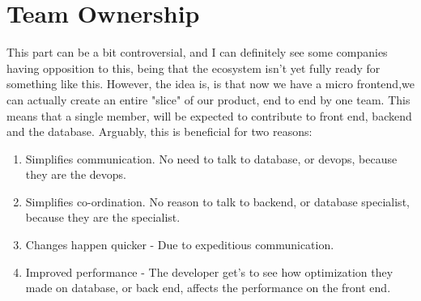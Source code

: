 \section{Team Ownership}
This part can be a bit controversial, and I can definitely see some companies having opposition to this, being that the ecosystem isn't yet fully ready for something like this. However, the idea is, is that now we have a micro frontend,we can actually create an entire "slice" of our product, end to end by one team. This means that a single member, will be expected to contribute to front end, backend and the database. Arguably, this is beneficial for two reasons: 
\begin{enumerate}
  \item Simplifies communication. No need to talk to database, or devops, because they are the devops. 
  \item Simplifies co-ordination. No reason to talk to backend, or database specialist, because they are the specialist. 
  \item Changes happen quicker - Due to expeditious communication.
  \item Improved performance - The developer get's to see how optimization they made on database, or back end, affects the performance on the front end. 
\end{enumerate}